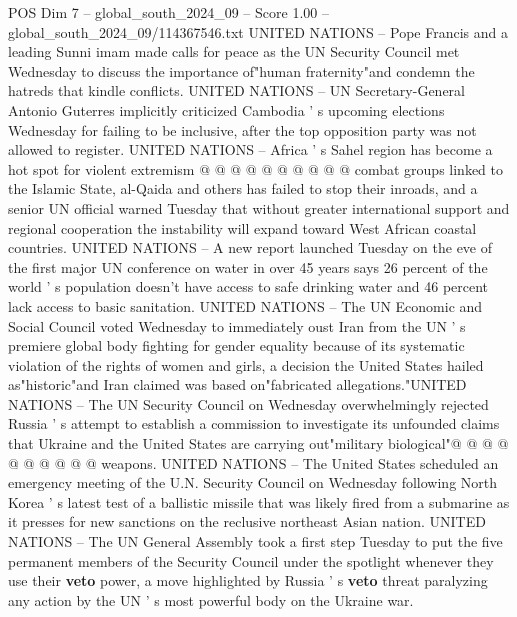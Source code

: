 \begin{textsample}{POS Dim 7 – global\_south\_2024\_09 – Score 1.00 – global\_south\_2024\_09/114367546.txt}
UNITED NATIONS -- Pope Francis and a leading Sunni imam made calls for peace as the UN Security Council met Wednesday to discuss the importance of"human fraternity"and condemn the hatreds that kindle conflicts.
UNITED NATIONS -- UN Secretary-General Antonio Guterres implicitly criticized Cambodia ' s upcoming elections Wednesday for failing to be inclusive, after the top opposition party was not allowed to register.
UNITED NATIONS -- Africa ' s Sahel region has become a hot spot for violent extremism @ @ @ @ @ @ @ @ @ @ combat groups linked to the Islamic State, al-Qaida and others has failed to stop their inroads, and a senior UN official warned Tuesday that without greater international support and regional cooperation the instability will expand toward West African coastal countries.
UNITED NATIONS -- A new report launched Tuesday on the eve of the first major UN conference on water in over 45 years says 26 percent of the world ' s population doesn't have access to safe drinking water and 46 percent lack access to basic sanitation.
UNITED NATIONS -- The UN Economic and Social Council voted Wednesday to immediately oust Iran from the UN ' s premiere global body fighting for gender equality because of its systematic violation of the rights of women and girls, a decision the United States hailed as"historic"and Iran claimed was based on"fabricated allegations."UNITED NATIONS -- The UN Security Council on Wednesday overwhelmingly rejected Russia ' s attempt to establish a commission to investigate its unfounded claims that Ukraine and the United States are carrying out"military biological"@ @ @ @ @ @ @ @ @ @ weapons.
UNITED NATIONS -- The United States scheduled an emergency meeting of the U.N.
Security Council on Wednesday following North Korea ' s latest test of a ballistic missile that was likely fired from a submarine as it presses for new sanctions on the reclusive northeast Asian nation.
UNITED NATIONS -- The UN General Assembly took a first step Tuesday to put the five permanent members of the Security Council under the spotlight whenever they use their \textbf{veto} power, a move highlighted by Russia ' s \textbf{veto} threat paralyzing any action by the UN ' s most powerful body on the Ukraine war.

\end{textsample}
